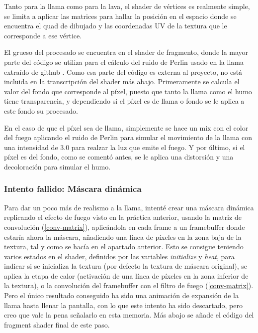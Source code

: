 \documentclass[12pt]{article}%
\begin{document}
	Tanto para la llama como para la lava, el shader de vértices es realmente simple, se limita a aplicar las matrices para hallar la posición en el espacio donde se encuentra el quad de dibujado y las coordenadas UV de la textura que le corresponde a ese vértice.



	El grueso del procesado se encuentra en el shader de fragmento, donde la mayor parte del código se utiliza para el cálculo del ruido de Perlin usado en la llama extraído de github \cite{perlin-wlgl}. Como esa parte del código es externa al proyecto, no está incluida en la transcripción del shader más abajo. Primeramente se calcula el valor del fondo que corresponde al píxel, puesto que tanto la llama como el humo tiene transparencia, y dependiendo si el píxel es de llama o fondo se le aplica a este fondo su procesado.
	
	En el caso de que el píxel sea de llama, simplemente se hace un mix con el color del fuego aplicando el ruido de Perlin para simular el movimiento de la llama con una intensidad de $3.0$ para realzar la luz que emite el fuego. Y por último, si el píxel es del fondo, como se comentó antes, se le aplica una distorsión y una decoloración para simular el humo.



\subsubsection{Intento fallido: Máscara dinámica}
	
		Para dar un poco más de realismo a la llama, intenté crear una máscara dinámica replicando el efecto de fuego visto en la práctica anterior, usando la matriz de convolución (\ref{conv-matrix}), aplicándola en cada frame a un framebuffer donde estaría ahora la máscara, añadiendo una línea de píxeles en la zona baja de la textura, tal y como se hacía en el apartado anterior. Esto se consigue teniendo varios estados en el shader, definidos por las variables \textit{initialize} y \textit{heat}, para indicar si se inicializa la textura (por defecto la textura de máscara original), se aplica la etapa de calor (activación de una línea de píxeles en la zona inferior de la textura), o la convolución del framebuffer con el filtro de fuego (\ref{conv-matrix}). Pero el único resultado conseguido ha sido una animación de expansión de la llama hasta llenar la pantalla, con lo que este intento ha sido descartado, pero creo que vale la pena señalarlo en esta memoria. Más abajo se añade el código del fragment shader final de este paso.
	
\end{document}
